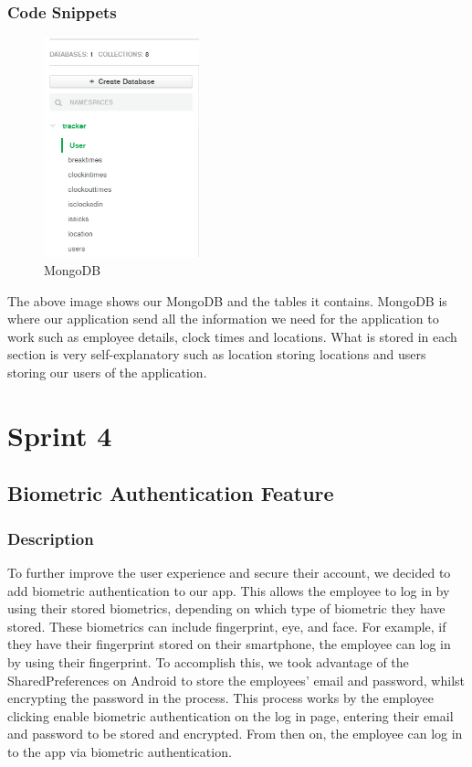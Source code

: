 \subsubsection{Code Snippets}
\begin{figure}[h]
    \centering
    \includegraphics[width=0.4\textwidth]{img/database.png}
    \caption{MongoDB}
    \label{fig}
\end{figure}
The above image shows our MongoDB and the tables it contains. MongoDB is where our application send all the information we need for the application to work such as employee details, clock times and locations. What is stored in each section is very self-explanatory such as location storing locations and users storing our users of the application.
\section{Sprint 4}
\subsection{Biometric Authentication Feature}
\subsubsection{Description}
To further improve the user experience and secure their account, we decided to add biometric authentication \cite{bioauth} to our app. This allows the employee to log in by using their stored biometrics, depending on which type of biometric they have stored. These biometrics can include fingerprint, eye, and face. For example, if they have their fingerprint stored on their smartphone, the employee can log in by using their fingerprint. To accomplish this, we took advantage of the SharedPreferences on Android to store the employees’ email and password, whilst encrypting the password in the process. This process works by the employee clicking enable biometric authentication on the log in page, entering their email and password to be stored and encrypted. From then on, the employee can log in to the app via biometric authentication.  
